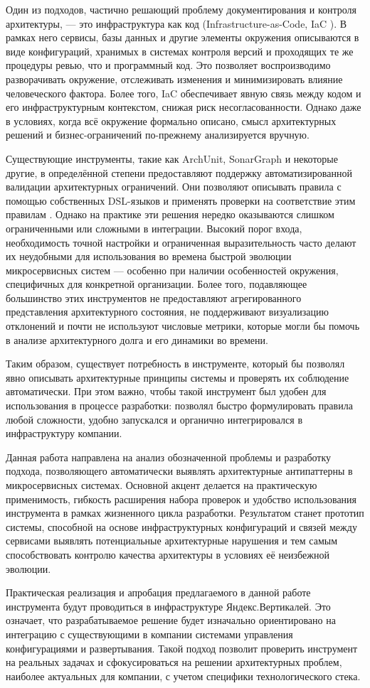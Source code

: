 Один из подходов, частично решающий проблему документирования и контроля архитектуры, — это инфраструктура как код (Infrastructure-as-Code, IaC \cite{iac-concept}). В рамках него сервисы, базы данных и другие элементы окружения описываются в виде конфигураций, хранимых в системах контроля версий и проходящих те же процедуры ревью, что и программный код. Это позволяет воспроизводимо разворачивать окружение, отслеживать изменения и минимизировать влияние человеческого фактора. Более того, IaC обеспечивает явную связь между кодом и его инфраструктурным контекстом, снижая риск несогласованности. Однако даже в условиях, когда всё окружение формально описано, смысл архитектурных решений и бизнес-ограничений по-прежнему анализируется вручную.

Существующие инструменты, такие как ArchUnit, SonarGraph и некоторые другие, в определённой степени предоставляют поддержку автоматизированной валидации архитектурных ограничений. Они позволяют описывать правила с помощью собственных DSL-языков и применять проверки на соответствие этим правилам \cite{dsl-fowler}. Однако на практике эти решения нередко оказываются слишком ограниченными или сложными в интеграции. Высокий порог входа, необходимость точной настройки и ограниченная выразительность часто делают их неудобными для использования во времена быстрой эволюции микросервисных систем — особенно при наличии особенностей окружения, специфичных для конкретной организации. Более того, подавляющее большинство этих инструментов не предоставляют агрегированного представления архитектурного состояния, не поддерживают визуализацию отклонений и почти не используют числовые метрики, которые могли бы помочь в анализе архитектурного долга и его динамики во времени.

Таким образом, существует потребность в инструменте, который бы позволял явно описывать архитектурные принципы системы и проверять их соблюдение автоматически. При этом важно, чтобы такой инструмент был удобен для использования в процессе разработки: позволял быстро формулировать правила любой сложности, удобно запускался и органично интегрировался в инфраструктуру компании.

Данная работа направлена на анализ обозначенной проблемы и разработку подхода, позволяющего автоматически выявлять архитектурные антипаттерны в микросервисных системах. Основной акцент делается на практическую применимость, гибкость расширения набора проверок и удобство использования инструмента в рамках жизненного цикла разработки. Результатом станет прототип системы, способной на основе инфраструктурных конфигураций и связей между сервисами выявлять потенциальные архитектурные нарушения и тем самым способствовать контролю качества архитектуры в условиях её неизбежной эволюции.

Практическая реализация и апробация предлагаемого в данной работе инструмента будут проводиться в инфраструктуре Яндекс.Вертикалей. Это означает, что разрабатываемое решение будет изначально ориентировано на интеграцию с существующими в компании системами управления конфигурациями и развертывания. Такой подход позволит проверить инструмент на реальных задачах и сфокусироваться на решении архитектурных проблем, наиболее актуальных для компании, с учетом специфики технологического стека.

